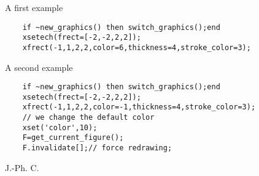 \begin{examples}

A first example

  \begin{Verbatim}
    if ~new_graphics() then switch_graphics();end
    xsetech(frect=[-2,-2,2,2]);
    xfrect(-1,1,2,2,color=6,thickness=4,stroke_color=3);
  \end{Verbatim}

A second example

  \begin{Verbatim}
    if ~new_graphics() then switch_graphics();end
    xsetech(frect=[-2,-2,2,2]);
    xfrect(-1,1,2,2,color=-1,thickness=4,stroke_color=3);
    // we change the default color
    xset('color',10);
    F=get_current_figure();
    F.invalidate[];// force redrawing;
  \end{Verbatim}
\end{examples}
\begin{manseealso}
    
\end{manseealso}
\begin{authors}
  J.-Ph. C.  
\end{authors}

